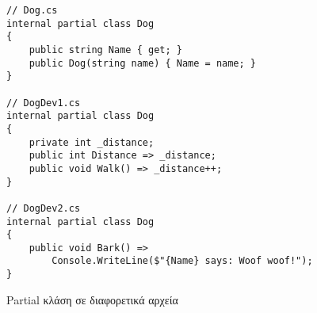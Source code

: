 \begin{listing}[htbp]
\begin{verbatim}
// Dog.cs
internal partial class Dog
{
    public string Name { get; }
    public Dog(string name) { Name = name; }
}

// DogDev1.cs
internal partial class Dog
{
    private int _distance;
    public int Distance => _distance;
    public void Walk() => _distance++;
}

// DogDev2.cs
internal partial class Dog
{
    public void Bark() => 
        Console.WriteLine($"{Name} says: Woof woof!");
}
\end{verbatim}
\caption{Partial κλάση σε διαφορετικά αρχεία}
\label{PartialDogClasses}
\end{listing}